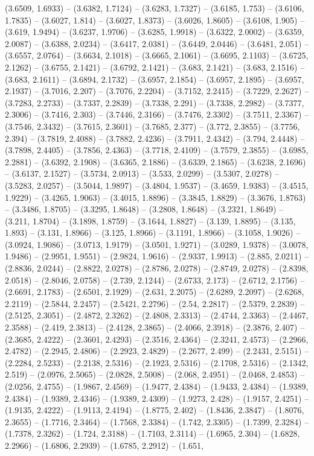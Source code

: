 (3.6509, 1.6933) -- (3.6382, 1.7124) -- (3.6283, 1.7327) -- (3.6185, 1.753) -- (3.6106, 1.7835) -- (3.6027, 1.814) -- (3.6027, 1.8373) -- (3.6026, 1.8605) -- (3.6108, 1.905) -- (3.619, 1.9494) -- (3.6237, 1.9706) -- (3.6285, 1.9918) -- (3.6322, 2.0002) -- (3.6359, 2.0087) -- (3.6388, 2.0234) -- (3.6417, 2.0381) -- (3.6449, 2.0446) -- (3.6481, 2.051) -- (3.6557, 2.0764) -- (3.6634, 2.1018) -- (3.6665, 2.1061) -- (3.6695, 2.1103) -- (3.6725, 2.1262) -- (3.6755, 2.1421) -- (3.6792, 2.1421) -- (3.683, 2.1421) -- (3.683, 2.1516) -- (3.683, 2.1611) -- (3.6894, 2.1732) -- (3.6957, 2.1854) -- (3.6957, 2.1895) -- (3.6957, 2.1937) -- (3.7016, 2.207) -- (3.7076, 2.2204) -- (3.7152, 2.2415) -- (3.7229, 2.2627) -- (3.7283, 2.2733) -- (3.7337, 2.2839) -- (3.7338, 2.291) -- (3.7338, 2.2982) -- (3.7377, 2.3006) -- (3.7416, 2.303) -- (3.7446, 2.3166) -- (3.7476, 2.3302) -- (3.7511, 2.3367) -- (3.7546, 2.3432) -- (3.7615, 2.3601) -- (3.7685, 2.377) -- (3.772, 2.3855) -- (3.7756, 2.394) -- (3.7819, 2.4088) -- (3.7882, 2.4236) -- (3.7911, 2.4342) -- (3.794, 2.4448) -- (3.7898, 2.4405) -- (3.7856, 2.4363) -- (3.7718, 2.4109) -- (3.7579, 2.3855) -- (3.6985, 2.2881) -- (3.6392, 2.1908) -- (3.6365, 2.1886) -- (3.6339, 2.1865) -- (3.6238, 2.1696) -- (3.6137, 2.1527) -- (3.5734, 2.0913) -- (3.533, 2.0299) -- (3.5307, 2.0278) -- (3.5283, 2.0257) -- (3.5044, 1.9897) -- (3.4804, 1.9537) -- (3.4659, 1.9383) -- (3.4515, 1.9229) -- (3.4265, 1.9063) -- (3.4015, 1.8896) -- (3.3845, 1.8829) -- (3.3676, 1.8763) -- (3.3486, 1.8705) -- (3.3295, 1.8648) -- (3.2808, 1.8648) -- (3.2321, 1.8649) -- (3.211, 1.8704) -- (3.1898, 1.8759) -- (3.1644, 1.8827) -- (3.139, 1.8895) -- (3.135, 1.893) -- (3.131, 1.8966) -- (3.125, 1.8966) -- (3.1191, 1.8966) -- (3.1058, 1.9026) -- (3.0924, 1.9086) -- (3.0713, 1.9179) -- (3.0501, 1.9271) -- (3.0289, 1.9378) -- (3.0078, 1.9486) -- (2.9951, 1.9551) -- (2.9824, 1.9616) -- (2.9337, 1.9913) -- (2.885, 2.0211) -- (2.8836, 2.0244) -- (2.8822, 2.0278) -- (2.8786, 2.0278) -- (2.8749, 2.0278) -- (2.8398, 2.0518) -- (2.8046, 2.0758) -- (2.739, 2.1244) -- (2.6733, 2.173) -- (2.6712, 2.1756) -- (2.6691, 2.1783) -- (2.6501, 2.1929) -- (2.631, 2.2075) -- (2.6289, 2.2097) -- (2.6268, 2.2119) -- (2.5844, 2.2457) -- (2.5421, 2.2796) -- (2.54, 2.2817) -- (2.5379, 2.2839) -- (2.5125, 2.3051) -- (2.4872, 2.3262) -- (2.4808, 2.3313) -- (2.4744, 2.3363) -- (2.4467, 2.3588) -- (2.419, 2.3813) -- (2.4128, 2.3865) -- (2.4066, 2.3918) -- (2.3876, 2.407) -- (2.3685, 2.4222) -- (2.3601, 2.4293) -- (2.3516, 2.4364) -- (2.3241, 2.4573) -- (2.2966, 2.4782) -- (2.2945, 2.4806) -- (2.2923, 2.4829) -- (2.2677, 2.499) -- (2.2431, 2.5151) -- (2.2284, 2.5233) -- (2.2138, 2.5316) -- (2.1923, 2.5316) -- (2.1708, 2.5316) -- (2.1342, 2.519) -- (2.0976, 2.5065) -- (2.0828, 2.5008) -- (2.068, 2.4951) -- (2.0468, 2.4853) -- (2.0256, 2.4755) -- (1.9867, 2.4569) -- (1.9477, 2.4384) -- (1.9433, 2.4384) -- (1.9389, 2.4384) -- (1.9389, 2.4346) -- (1.9389, 2.4309) -- (1.9273, 2.428) -- (1.9157, 2.4251) -- (1.9135, 2.4222) -- (1.9113, 2.4194) -- (1.8775, 2.402) -- (1.8436, 2.3847) -- (1.8076, 2.3655) -- (1.7716, 2.3464) -- (1.7568, 2.3384) -- (1.742, 2.3305) -- (1.7399, 2.3284) -- (1.7378, 2.3262) -- (1.724, 2.3188) -- (1.7103, 2.3114) -- (1.6965, 2.304) -- (1.6828, 2.2966) -- (1.6806, 2.2939) -- (1.6785, 2.2912) -- (1.651, 